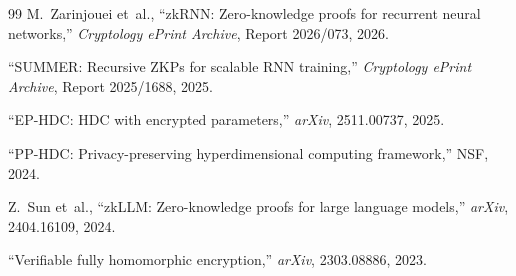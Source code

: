 \documentclass[11pt,twocolumn]{article}
\begin{document}
\begin{thebibliography}{99}
M.~Zarinjouei et~al., ``zkRNN: Zero-knowledge proofs for recurrent neural networks,'' \emph{Cryptology ePrint Archive}, Report 2026/073, 2026.

``SUMMER: Recursive ZKPs for scalable RNN training,'' \emph{Cryptology ePrint Archive}, Report 2025/1688, 2025.

``EP-HDC: HDC with encrypted parameters,'' \emph{arXiv}, 2511.00737, 2025.

``PP-HDC: Privacy-preserving hyperdimensional computing framework,'' NSF, 2024.

Z.~Sun et~al., ``zkLLM: Zero-knowledge proofs for large language models,'' \emph{arXiv}, 2404.16109, 2024.

``Verifiable fully homomorphic encryption,'' \emph{arXiv}, 2303.08886, 2023.

\end{thebibliography}
\end{document}
